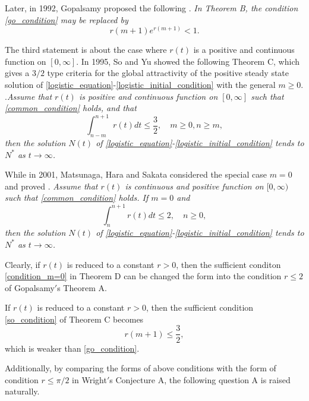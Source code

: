 \documentclass{HZNUMCM}
\begin{document}
Later, in 1992, Gopalsamy  \cite{1992_Gopalsamy}  proposed the following
 \vskip 0.2cm. {\it In Theorem B, the condition \eqref{go_condition} may be replaced by
$$  r(m+1)e^{r(m+1)}<1.  $$}

The third statement is about the case where $r(t)$ is a positive and
continuous function on $[0,\infty]$.
In 1995, So and Yu \cite{1995_so_R1339824} showed the following Theorem C, which gives a $3/2$ type criteria for the
global attractivity  of the positive steady state solution of
 \eqref{logistic_equation}-\eqref{logistic_initial_condition}  with the general $m\geqslant 0$.
 \vskip 0.2cm .{\it Assume that $r(t)$  is positive and continuous function on $[0,\infty]$ such that \eqref{common_condition} holds, and that
\begin{equation}\label{so_condition}
\int_{n-m}^{n+1}r(t)dt\leqslant \frac 3 2, \quad m\geqslant 0,n\geqslant m,
\end{equation}then the solution $N(t)$ of \eqref{logistic_equation}-\eqref{logistic_initial_condition}  tends to $N^*$ as $t\rightarrow\infty$.
}

While in 2001, Matsunaga, Hara and Sakata \cite{2001_matsunaga_MR1828948} considered the special case $m=0$ and proved
 \vskip 0.2cm.
{\it Assume that
$r(t)$ is continuous and positive function on $[0,\infty)$ such that \eqref{common_condition} holds. If $m=0$  and
\begin{equation}\label{condition_m=0}
\int_{n}^{n+1}r(t)dt\leqslant 2,\quad n\geqslant 0,
\end{equation}then the solution $N(t)$ of \eqref{logistic_equation}-\eqref{logistic_initial_condition}  tends to $N^*$ as $t\rightarrow\infty$.
}
\begin{remark}
Clearly, if $r(t)$  is reduced to a constant $r>0$, then the sufficient conditon \eqref{condition_m=0}  in Theorem D can be changed the form  into the condition $r\leqslant 2$ of Gopalsamy$'$s Theorem A.
\end{remark}
\begin{remark}
If $r(t)$  is reduced to a constant $r>0$, then the sufficient condition \eqref{so_condition}  of Theorem C becomes
\begin{equation*}
r(m+1)\leqslant \frac 3 2,
\end{equation*} which is  weaker than \eqref{go_condition}.
\end{remark}

Additionally, by comparing the forms of above conditions with the form of condition $r\leqslant{\pi/2}$ in Wright$'$s Conjecture A, the following question A is raised  naturally.
\end{document}
